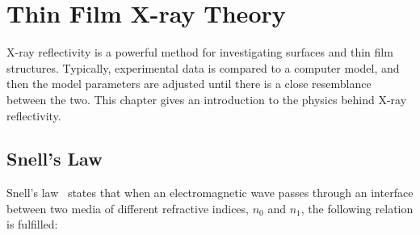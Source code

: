 \documentclass[10pt,twoside, b5paper,pdftex]{report}
\begin{document}
\chapter{Thin Film X-ray Theory}
X-ray reflectivity is a powerful method for investigating surfaces and thin film structures. Typically, experimental data is compared to a computer model, and then the model parameters are adjusted until there is a close resemblance between the two. %
This chapter gives an introduction to the physics behind X-ray reflectivity.





\section{Snell's Law}
Snell's law~\cite{PEDROTTI} states that when an electromagnetic wave passes through an interface between two media of different refractive indices, $n_{0}$ and $n_{1}$, the following relation is fulfilled:
\end{document}
